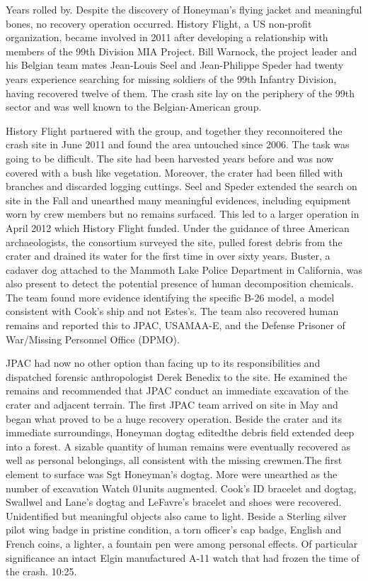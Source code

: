 \documentclass{article}
\begin{document}
\begin{multicols}{3}
Years rolled by. Despite the discovery of Honeyman’s flying jacket and meaningful bones, no recovery operation occurred. History Flight, a US non-profit organization, became involved in 2011 after developing a relationship with members of the 99th Division MIA Project. Bill Warnock, the project leader and his Belgian team mates Jean-Louis Seel and Jean-Philippe Speder had twenty years experience searching for missing soldiers of the 99th Infantry Division, having recovered twelve of them. The crash site lay on the periphery of the 99th sector and was well known to the Belgian-American group.

History Flight partnered with the group, and together they reconnoitered the crash site in June 2011 and found the area untouched since 2006. The task was going to be difficult. The site had been harvested years before and was now covered with a bush like vegetation. Moreover, the crater had been filled with branches and discarded logging cuttings. Seel and Speder extended the search on site in the Fall and unearthed many meaningful evidences, including equipment worn by crew members but no remains surfaced. This led to a larger operation in April 2012 which History Flight funded. Under the guidance of three American archaeologists, the consortium surveyed the site, pulled forest debris from the crater and drained its water for the first time in over sixty years. Buster, a cadaver dog attached to the Mammoth Lake Police Department in California, was also present to detect the potential presence of human decomposition chemicals. The team found more evidence identifying the specific B-26 model, a model consistent with Cook’s ship and not Estes’s. The team also recovered human remains and reported this to JPAC, USAMAA-E, and the Defense Prisoner of War/Missing Personnel Office (DPMO).

JPAC had now no other option than facing up to its responsibilities and dispatched forensic anthropologist Derek Benedix to the site. He examined the remains and recommended that JPAC conduct an immediate excavation of the crater and adjacent terrain. The first JPAC team arrived on site in May and began what proved to be a huge recovery operation. Beside the crater and its immediate surroundings, Honeyman dogtag editedthe debris field extended deep into a forest. A sizable quantity of human remains were eventually recovered as well as personal belongings, all consistent with the missing crewmen.The first element to surface was Sgt Honeyman’s dogtag. More were unearthed as the number of excavation Watch 01units augmented. Cook’s ID bracelet and dogtag, Swallwel and Lane’s dogtag and LeFavre’s bracelet and shoes were recovered. Unidentified but meaningful objects also came to light. Beside  a Sterling silver pilot wing badge in pristine condition, a torn officer’s cap badge,  English and French coins, a lighter, a fountain pen were among personal effects. Of particular significance an intact Elgin manufactured A-11 watch that had frozen the time of the crash. 10:25.


\end{multicols}
\end{document}
